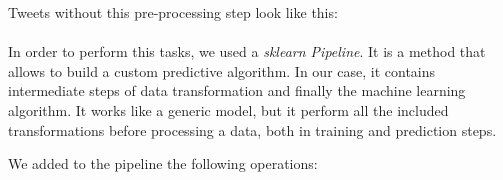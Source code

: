Tweets without this pre-processing step look like this:\\

\\

In order to perform this tasks, we used a \textit{sklearn Pipeline}. It is a method that allows to build a custom predictive algorithm. In our case, it contains intermediate steps of data transformation and finally the machine learning algorithm. It works like a generic model, but it perform all the included transformations before processing a data, both in training and prediction steps.

We added to the pipeline the following operations:

